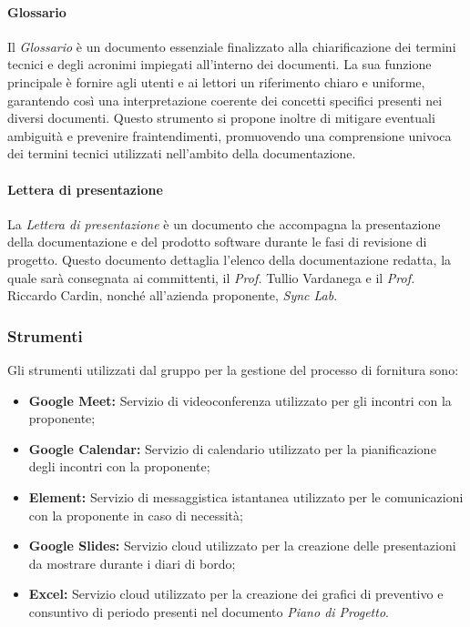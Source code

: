 \paragraph{Glossario}
Il \textit{Glossario} è un documento essenziale finalizzato alla chiarificazione dei termini tecnici e degli acronimi impiegati all'interno dei documenti. La sua funzione principale è fornire agli utenti e ai lettori un riferimento chiaro e uniforme, garantendo così una interpretazione coerente dei concetti specifici presenti nei diversi documenti. Questo strumento si propone inoltre di mitigare eventuali ambiguità e prevenire fraintendimenti, promuovendo una comprensione univoca dei termini tecnici utilizzati nell'ambito della documentazione.

\paragraph{Lettera di presentazione}
La \textit{Lettera di presentazione} è un documento che accompagna la presentazione della documentazione e del prodotto software durante le fasi di revisione di progetto. Questo documento dettaglia l'elenco della documentazione redatta, la quale sarà consegnata ai committenti, il \textit{Prof.} Tullio Vardanega e il \textit{Prof.} Riccardo Cardin, nonché all'azienda proponente, \textit{Sync Lab}.

\subsubsection{Strumenti}
Gli strumenti utilizzati dal gruppo per la gestione del processo di fornitura sono:
\begin{itemize}
    \item \textbf{Google Meet:}
    Servizio di videoconferenza utilizzato per gli incontri con la proponente;
    \item  \textbf{Google Calendar:}
    Servizio di calendario utilizzato per la pianificazione degli incontri con la proponente;
    \item 
    \textbf{Element:}
    Servizio di messaggistica istantanea utilizzato per le comunicazioni con la proponente in caso di necessità;
    \item 
    \textbf{Google Slides:}
    Servizio cloud utilizzato per la creazione delle presentazioni da mostrare durante i diari di bordo;
    \item  \textbf{Excel:} Servizio cloud utilizzato per la creazione dei grafici di preventivo e consuntivo di periodo presenti nel documento \textit{Piano di Progetto}.
\end{itemize}

